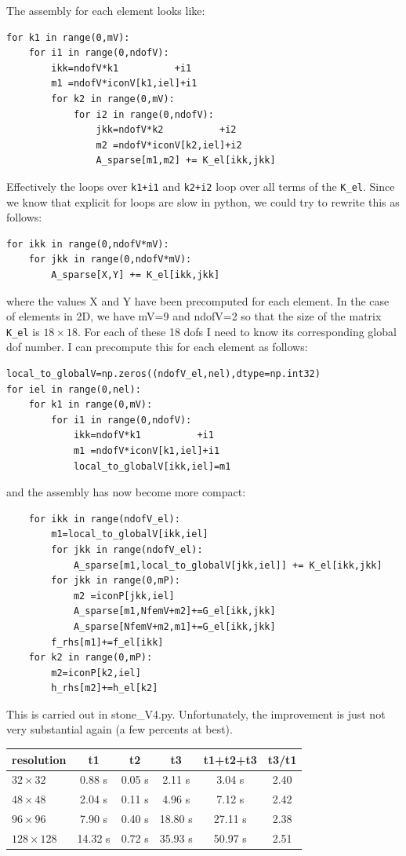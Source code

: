 The assembly for each element looks like:
\begin{lstlisting}
for k1 in range(0,mV):
    for i1 in range(0,ndofV):
        ikk=ndofV*k1          +i1
        m1 =ndofV*iconV[k1,iel]+i1
        for k2 in range(0,mV):
            for i2 in range(0,ndofV):
                jkk=ndofV*k2          +i2
                m2 =ndofV*iconV[k2,iel]+i2
                A_sparse[m1,m2] += K_el[ikk,jkk]
\end{lstlisting}
Effectively the loops over {\tt k1+i1} and {\tt k2+i2} loop over all terms of the {\tt K\_el}.
Since we know that explicit for loops are slow in python, we could try to rewrite this as follows:
\begin{lstlisting}
for ikk in range(0,ndofV*mV): 
    for jkk in range(0,ndofV*mV): 
        A_sparse[X,Y] += K_el[ikk,jkk]
\end{lstlisting}
where the values X and Y have been precomputed for each element. 
In the case of \QtwoQone elements in 2D, we have mV=9 and ndofV=2 so that 
the size of the matrix {\tt K\_el} is $18\times 18$. For each of these 18 dofs 
I need to know its corresponding global dof number. 
I can precompute this for each element as follows:
 
\begin{lstlisting}
local_to_globalV=np.zeros((ndofV_el,nel),dtype=np.int32)
for iel in range(0,nel):
    for k1 in range(0,mV):
        for i1 in range(0,ndofV):
            ikk=ndofV*k1          +i1
            m1 =ndofV*iconV[k1,iel]+i1
            local_to_globalV[ikk,iel]=m1
\end{lstlisting}
and the assembly has now become more compact:
\begin{lstlisting}
    for ikk in range(ndofV_el):
        m1=local_to_globalV[ikk,iel]
        for jkk in range(ndofV_el):
            A_sparse[m1,local_to_globalV[jkk,iel]] += K_el[ikk,jkk]
        for jkk in range(0,mP):
            m2 =iconP[jkk,iel]
            A_sparse[m1,NfemV+m2]+=G_el[ikk,jkk]
            A_sparse[NfemV+m2,m1]+=G_el[ikk,jkk]
        f_rhs[m1]+=f_el[ikk]
    for k2 in range(0,mP):
        m2=iconP[k2,iel]
        h_rhs[m2]+=h_el[k2]
\end{lstlisting}
This is carried out in {\pythonfile stone\_V4.py}. Unfortunately, 
the improvement is just not very substantial again (a few percents at best).

\begin{center}
\begin{tabular}{lccccc}
\hline
resolution & t1 & t2 & t3 & t1+t2+t3 & t3/t1\\ 
\hline
\hline
$32\times 32$   &  0.88 s& 0.05 s&  2.11 s&  3.04 s& 2.40 \\ 
$48\times 48$   &  2.04 s& 0.11 s&  4.96 s&  7.12 s& 2.42 \\
$96\times 96$   &  7.90 s& 0.40 s& 18.80 s& 27.11 s& 2.38 \\
$128\times 128$ & 14.32 s& 0.72 s& 35.93 s& 50.97 s& 2.51 \\
\hline
\end{tabular}
\end{center}

